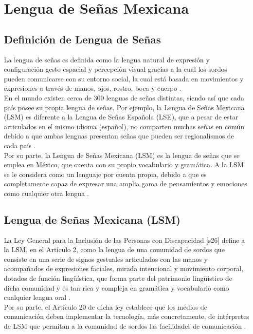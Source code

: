 \section{Lengua de Señas Mexicana}
\subsection{Definición de Lengua de Señas}
La lengua de señas es definida como la lengua natural de expresión y configuración gesto-espacial y percepción visual gracias a la cual los sordos pueden comunicarse con su entorno social, la cual está basada en movimientos y expresiones a través de manos, ojos, rostro, boca y cuerpo \cite{ref33}.\\

En el mundo existen cerca de 300 lenguas de señas distintas, siendo así que cada país posee su propia lengua de señas. Por ejemplo, la Lengua de Señas Mexicana (LSM) es diferente a la Lengua de Señas Española (LSE), que a pesar de estar articulados en el mismo idioma (español), no comparten muchas señas en común debido a que ambas lenguas presentan señas que pueden ser regionalismos de cada país \cite{ref33}.\\

Por su parte, la Lengua de Señas Mexicana (LSM) es la lengua de señas que se emplea en México, que cuenta con su propio vocabulario y gramática. A la LSM se le considera como un lenguaje por cuenta propia, debido a que es completamente capaz de expresar una amplia gama de pensamientos y emociones como cualquier otra lengua \cite{ref33}.

\subsection{Lengua de Señas Mexicana (LSM)}
La Ley General para la Inclusión de las Personas con Discapacidad [s26] define a la LSM, en el Artículo 2, como la lengua de una comunidad de sordos que consiste en una serie de signos gestuales articulados con las manos y acompañados de expresiones faciales, mirada intencional y movimiento corporal, dotados de función lingüística, que forma parte del patrimonio lingüistico de dicha comunidad y es tan rica y compleja en gramática y vocabulario como cualquier lengua oral \cite{ref34}.\\

Por su parte, el Artículo 20 de dicha ley establece que los medios de comunicación deben implementar la tecnología, más concretamente, de intérpretes de LSM que permitan a la comunidad de sordos las facilidades de comunicación \cite{ref34}.\\

